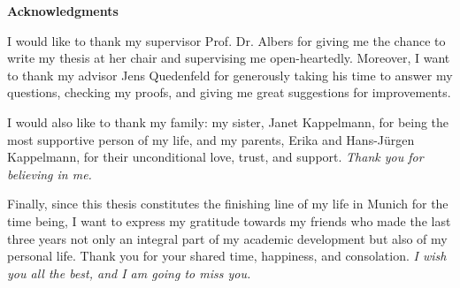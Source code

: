 \thispagestyle{empty}
\vspace*{20mm}

\begin{center}
\textbf{{Acknowledgments}}
\end{center}

\vspace{10mm}
I would like to thank my supervisor Prof. Dr. Albers for giving me the chance to write my thesis at her chair and supervising me open-heartedly. Moreover, I want to thank my advisor Jens Quedenfeld for generously taking his time to answer my questions, checking my proofs, and giving me great suggestions for improvements.

I would also like to thank my family: my sister, Janet Kappelmann, for being the most supportive person of my life, and my parents, Erika and Hans-Jürgen Kappelmann, for their unconditional love, trust, and support. \emph{Thank you for believing in me.}

Finally, since this thesis constitutes the finishing line of my life in Munich for the time being, I want to express my gratitude towards my friends who made the last three years not only an integral part of my academic development but also of my personal life. Thank you for your shared time, happiness, and consolation. \emph{I wish you all the best, and I am going to miss you.}

\cleardoublepage{}
